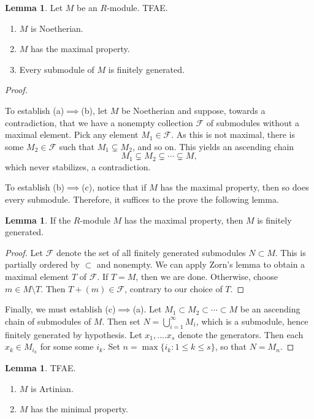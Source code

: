 \documentclass[10pt,letterpaper,cm]{nupset}
\theoremstyle{definition}
\theoremstyle{theorem}
\newtheorem{lemma}[definition]{Lemma}
\theoremstyle{remark}
\newcommand{\1}{\mathbf{1}}
\newcommand{\0}{\vec 0}
\begin{document}
\begin{lemma} Let $M$ be an $R$-module. TFAE.
\begin{enumerate}[label=(\alph*)]
\item $M$ is Noetherian.
\item $M$ has the maximal property. 
\item Every submodule of $M$ is finitely generated. 
\end{enumerate}
\end{lemma}
\begin{proof} $ $

\smallskip

To establish (a)$\implies$(b), let $M$ be Noetherian and suppose, towards a contradiction, that we have a nonempty collection $\mathcal{F}$ of submodules without a maximal element. Pick any element $M_1\in \mathcal{F}$. As this is not maximal, there is some $M_2\in \mathcal{F}$ such that $M_1 \subsetneq M_2$, and so on. This yields an ascending chain
\[
M_1 \subsetneq M_2\subsetneq \cdots \subsetneq M,
\]
which never stabilizes, a contradiction.

\smallskip

To establish (b)$\implies$(c), notice that if $M$ has the maximal property, then so does every submodule. Therefore, it suffices to the prove the following lemma.
\begin{lemma}\label{l19}
If the $R$-module $M$ has the maximal property, then $M$ is finitely generated.
\end{lemma}
\begin{proof}
Let $\mathcal{F}$ denote the set of all finitely generated submodules $N\subset M$. This is partially ordered by $\subset$ and nonempty. We can apply Zorn's lemma to obtain a maximal element $T$ of $\mathcal{F}$. If $T=M$, then we are done. Otherwise, choose $m\in M \setminus T$. Then $T + (m) \in \mathcal{F}$, contrary to our choice of $T$. 
\end{proof}

Finally, we must establish (c)$\implies$(a). Let $M_1 \subset M_2 \subset \cdots \subset M$ be an ascending chain of submodules of $M$. Then set $N= \bigcup_{i=1}^{\infty} M_i$, which is a submodule, hence finitely generated by hypothesis. Let $x_1, \ldots. x_s$ denote the generators. Then each $x_k \in M_{i_k}$ for some some $i_k$. Set $n= \max\{i_k : 1\leq k \leq s\}$, so that $N = M_n$.
\end{proof}

\begin{lemma} TFAE.
\begin{enumerate}[label=(\alph*)]
\item $M$ is Artinian.
\item $M$ has the minimal property.
\end{enumerate}
\end{lemma}
\end{document}
